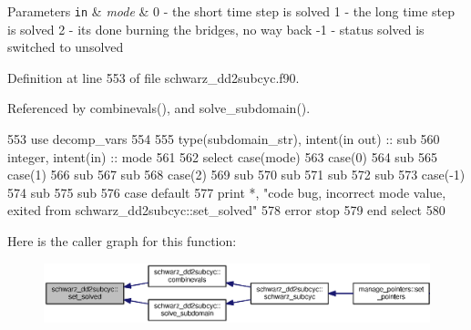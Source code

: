 \begin{DoxyParams}[1]{Parameters}
\mbox{\tt in}  & {\em mode} & 0 -\/ the short time step is solved 1 -\/ the long time step is solved 2 -\/ it\textquotesingle{}s done burning the bridges, no way back -\/1 -\/ status solved is switched to unsolved \\
\hline
\end{DoxyParams}


Definition at line 553 of file schwarz\+\_\+dd2subcyc.\+f90.



Referenced by combinevals(), and solve\+\_\+subdomain().


\begin{DoxyCode}
553       \textcolor{keywordtype}{use }decomp_vars
554       
555       \textcolor{keywordtype}{type}(subdomain_str), \textcolor{keywordtype}{intent(in out)} :: sub
560       \textcolor{keywordtype}{integer}, \textcolor{keywordtype}{intent(in)} :: mode
561       
562       \textcolor{keywordflow}{select case}(mode)
563         \textcolor{keywordflow}{case}(0)
564           sub%
565         \textcolor{keywordflow}{case}(1)
566           sub%
567           sub%
568         \textcolor{keywordflow}{case}(2)
569           sub%
570           sub%
571           sub%
572           sub%
573         \textcolor{keywordflow}{case}(-1)
574           sub%
575           sub%
576 \textcolor{keywordflow}{        case default}
577           print *, \textcolor{stringliteral}{"code bug, incorrect mode value, exited from schwarz\_dd2subcyc::set\_solved"}
578           error stop
579 \textcolor{keywordflow}{      end select}
580     
\end{DoxyCode}


Here is the caller graph for this function\+:\nopagebreak
\begin{figure}[H]
\begin{center}
\leavevmode
\includegraphics[width=350pt]{namespaceschwarz__dd2subcyc_af41fedc51000d37271c12eff94cdbe71_icgraph}
\end{center}
\end{figure}


